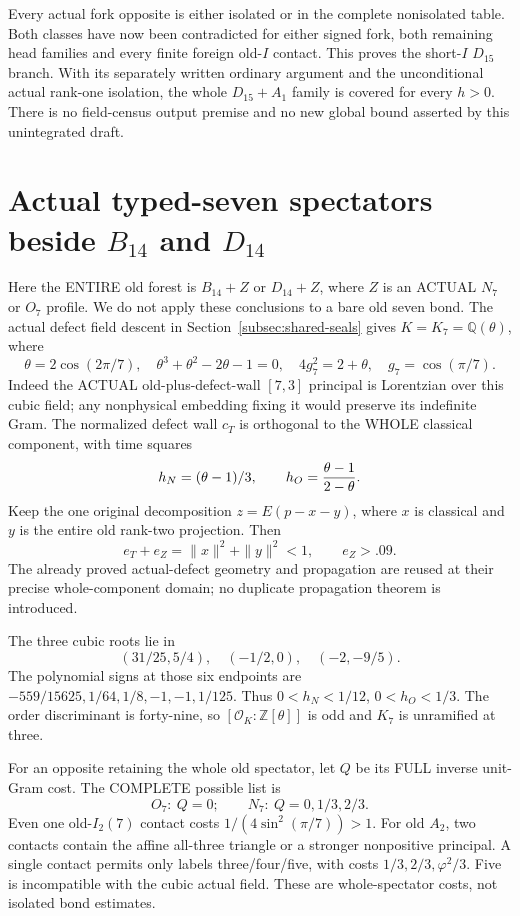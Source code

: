 Every actual fork opposite is either isolated or
in the complete nonisolated table.
Both classes have now been contradicted for either
signed fork, both remaining head families and
every finite foreign old-\(I\) contact.
This proves the short-\(I\) \(D_{15}\) branch.
With its separately written ordinary argument and
the unconditional actual rank-one isolation, the
whole \(D_{15}+A_1\) family is covered for every \(h>0\).
There is no field-census output premise and no
new global bound asserted by this unintegrated draft.

\section{Actual typed-seven spectators beside \(B_{14}\) and \(D_{14}\)}
\label{app:arithBD14typed}

Here the ENTIRE old forest is \(B_{14}+Z\) or
\(D_{14}+Z\), where \(Z\) is an ACTUAL \(N_7\)
or \(O_7\) profile.
We do not apply these conclusions to a bare old
seven bond.
The actual defect field descent in
Section~\ref{subsec:shared-seals} gives
\(K=K_7=\mathbb Q(\theta)\), where
\[
 \theta=2\cos(2\pi/7),\quad
 \theta^3+\theta^2-2\theta-1=0,\quad
 4g_7^2=2+\theta,\quad g_7=\cos(\pi/7).
\]
Indeed the ACTUAL old-plus-defect-wall \([7,3]\)
principal is Lorentzian over this cubic field;
any nonphysical embedding fixing it would preserve
its indefinite Gram.
The normalized defect wall \(c_T\) is orthogonal
to the WHOLE classical component, with time squares
\[
                     h_N=(\theta-1)/3,\qquad
                     h_O={\theta-1\over2-\theta}.
\]
Keep the one original decomposition \(z=E(p-x-y)\),
where \(x\) is classical and \(y\) is the entire
old rank-two projection.
Then
\[
                   e_T+e_Z=\|x\|^2+\|y\|^2<1,\qquad e_Z>.09 .
\]
The already proved actual-defect geometry and
propagation are reused at their precise whole-component
domain; no duplicate propagation theorem is introduced.

The three cubic roots lie in
\[
              (31/25,5/4),\quad(-1/2,0),\quad(-2,-9/5).
\]
The polynomial signs at those six endpoints are
\(-559/15625,1/64,1/8,-1,-1,1/125\).
Thus \(0<h_N<1/12\), \(0<h_O<1/3\).
The order discriminant is forty-nine, so
\([\mathcal O_K:\mathbb Z[\theta]]\) is odd and
\(K_7\) is unramified at three.

For an opposite retaining the whole old spectator,
let \(Q\) be its FULL inverse unit-Gram cost.
The COMPLETE possible list is
\[
                       O_7:\ Q=0;\qquad
                       N_7:\ Q=0,1/3,2/3 .
\tag{TQ}\label{eq:arithBD14foreign}
\]
Even one old-\(I_2(7)\) contact costs
\(1/(4\sin^2(\pi/7))>1\).
For old \(A_2\), two contacts contain the affine
all-three triangle or a stronger nonpositive principal.
A single contact permits only labels three/four/five,
with costs \(1/3,2/3,\varphi^2/3\).
Five is incompatible with the cubic actual field.
These are whole-spectator costs, not isolated
bond estimates.

